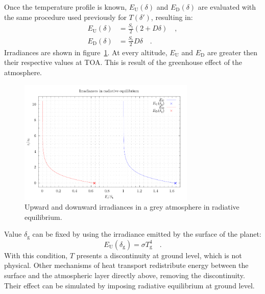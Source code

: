 \documentclass[a4paper,10pt,twocolumn,\classoptions]{article}
\begin{document}
Once the temperature profile is known, $E_\text{U}(\delta)$ and $E_\text{D}(\delta)$ are evaluated with the same procedure used previously for $T(\delta')$, resulting in:
\begin{align}
  \label{eq:irradiance_upward_solution}
  E_\text{U}(\delta) & = \frac{S_\text{t}}{2} (2 + D \delta) \quad , \\
  \label{eq:irradiance_downward_solution}
  E_\text{D}(\delta) & = \frac{S_\text{t}}{2} D \delta
  \quad .
\end{align}
Irradiances are shown in figure~\ref{fig:irradiance_radiative_equilibrium}. At every altitude, $E_\text{U}$ and $E_\text{D}$ are greater then their respective values at TOA. This is result of the greenhouse effect of the atmosphere.
\begin{figure}[h]
  \centering
  \includegraphics*[keepaspectratio=true,width=0.75\textwidth]{irradiance_radiative_equilibrium}
  \caption{Upward and downward irradiances in a grey atmosphere in radiative equilibrium.}
  \label{fig:irradiance_radiative_equilibrium}
\end{figure}

Value $\delta_\text{g}$ can be fixed by using the irradiance emitted by the surface of the planet:
\begin{equation}
  \label{eq:irradiance_upward_ground}
  E_\text{U}(\delta_\text{g}) = \sigma T_\text{g}^4
  \quad .
\end{equation}
With this condition, $T$ presents a discontinuity at ground level, which is not physical. Other mechanisms of heat transport redistribute energy between the surface and the atmospheric layer directly above, removing the discontinuity. Their effect can be simulated by imposing radiative equilibrium at ground level.
\end{document}
